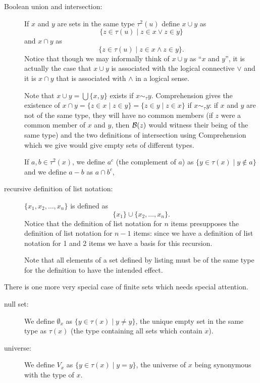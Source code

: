 \documentclass[12pt]{book}
\begin{document}
\begin{description}

\item[Boolean union and intersection:] If $x$ and $y$ are sets in the same type $\tau^2(u)$ define
$x \cup y$ as $$\{z \in \tau(u)\mid z \in x \vee z \in y\}$$ and $x \cap y$ as $$\{z \in \tau(u)
\mid z \in x \wedge z \in y\}.$$  Notice that though we may informally
think of $x \cup y$ as ``$x$ and $y$'', it is actually the case that
$x \cup y$ is associated with the logical connective $\vee$ and it is
$x \cap y$ that is associated with $\wedge$ in a logical sense.

Note that $x \cup y = \bigcup \{x,y\}$ exists if $x \sim_{\tau} y$.  Comprehension gives the existence of $x \cap y = \{z \in x\mid z \in y\} = \{z \in y \mid z \in x\}$ if
$x \sim_{\tau} y$:  if $x$ and $y$ are not of the same type, they will have no common members (if $z$ were a common member of $x$ and $y$, then ${\cal B}(z)$ would witness their being of the same type) and the two definitions of intersection using Comprehension which we give would give empty sets of different types.

If $a, b \in \tau^2(x)$, we define $a^c$ (the complement of $a$) as $\{y \in \tau(x)\mid y \not\in a\}$ and we define $a - b$ as $a \cap b^c$,

\item[recursive definition of list notation:] $\{x_1,x_2,\ldots,x_n\}$
is defined as $$\{x_1\} \cup \{x_2,\ldots,x_n\}.$$  Notice that the
definition of list notation for $n$ items presupposes the definition
of list notation for $n-1$ items: since we have a definition of list
notation for 1 and 2 items we have a basis for this recursion.

Note that all elements of a set defined by listing must be of the same
type for the definition to have the intended effect.

\end{description}



There is one more very special case of finite sets which needs special
attention.

\begin{description}

\item[null set:]  We define $\emptyset_x$ as $\{y \in \tau(x)\mid y \neq y\}$, the unique empty set
in the same type as $\tau(x)$ (the type containing all sets which contain $x$).

\item[universe:] We define $V_x$ as $\{y \in \tau(x) \mid y=y\}$, the universe of $x$ being synonymous with the type of $x$.
\end{description}
\end{document}

